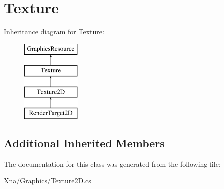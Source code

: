 \hypertarget{classMicrosoft_1_1Xna_1_1Framework_1_1Graphics_1_1Texture}{}\section{Texture}
\label{classMicrosoft_1_1Xna_1_1Framework_1_1Graphics_1_1Texture}
Inheritance diagram for Texture\+:\begin{figure}[H]
\begin{center}
\leavevmode
\includegraphics[height=4.000000cm]{classMicrosoft_1_1Xna_1_1Framework_1_1Graphics_1_1Texture}
\end{center}
\end{figure}
\subsection*{Additional Inherited Members}


The documentation for this class was generated from the following file\+:\begin{DoxyCompactItemize}
\item 
Xna/\+Graphics/\hyperlink{Texture2D_8cs}{Texture2\+D.\+cs}\end{DoxyCompactItemize}
